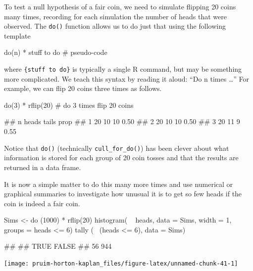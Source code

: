 To test a null hypothesis of a fair coin, we need to simulate flipping
20 coins many times, recording for each simulation the number of heads
that were observed. The \texttt{do()} function allows us to do just that
using the following template

\begin{Schunk}
\begin{Sinput}
do(n) * {stuff to do}             # pseudo-code
\end{Sinput}
\end{Schunk}

\noindent
where \texttt{\{stuff\ to\ do\}} is typically a single R command, but
may be something more complicated. We teach this syntax by reading it
aloud: ``Do n times \ldots{}'' For example, we can flip 20 coins three
times as follows.

\begin{Schunk}
\begin{Sinput}
do(3) * rflip(20)   # do 3 times flip 20 coins
\end{Sinput}
\begin{Soutput}
##    n heads tails prop
## 1 20    10    10 0.50
## 2 20    10    10 0.50
## 3 20    11     9 0.55
\end{Soutput}
\end{Schunk}

\noindent
Notice that \texttt{do()} (technically \texttt{cull\_for\_do()}) has
been clever about what information is stored for each group of 20 coin
tosses and that the results are returned in a data frame.

It is now a simple matter to do this many more times and use numerical
or graphical summaries to investigate how unusual it is to get so few
heads if the coin is indeed a fair coin.

\begin{Schunk}
\begin{Sinput}
Sims <- do (1000) * rflip(20)
histogram( ~ heads, data = Sims, width = 1, groups = heads <= 6)
tally ( ~(heads <= 6), data = Sims)
\end{Sinput}
\begin{Soutput}
## 
##  TRUE FALSE 
##    56   944
\end{Soutput}


\begin{center}\texttt{[image: pruim-horton-kaplan\_files/figure-latex/unnamed-chunk-41-1]} \end{center}

\end{Schunk}

